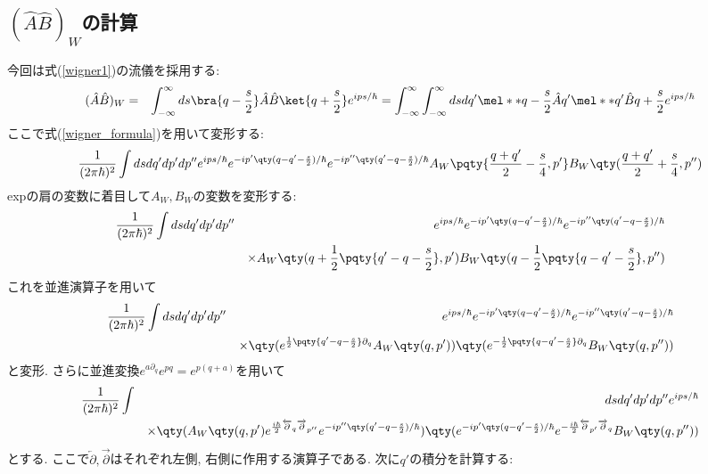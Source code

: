 \documentclass[10.5pt,a4paper]{jreport}
\begin{document}
\subsection{$(\hat{A}\hat{B})_W$の計算}
今回は式(\ref{wigner1})の流儀を採用する:
\begin{eqnarray}
  (\hat{A}\hat{B})_W &=& \int_{-\infty}^{\infty}ds \bra{q-\frac{s}{2}}\hat{A}\hat{B}\ket{q+\frac{s}{2}}e^{ips/\hbar}
  = \int_{-\infty}^{\infty}\int_{-\infty}^{\infty}ds dq' \mel**{q-\frac{s}{2}}{\hat{A}}{q'}\mel**{q'}{\hat{B}}{q+\frac{s}{2}}e^{ips/\hbar}\label{wigner_start}
\end{eqnarray}
ここで式(\ref{wigner_formula})を用いて変形する:
\begin{eqnarray}
  \frac{1}{(2\pi\hbar)^2}\int ds dq' dp' dp'' e^{ips/\hbar}e^{-ip'\qty(q-q'-\frac{s}{2})/\hbar} e^{-ip''\qty(q'-q-\frac{s}{2})/\hbar}A_W\pqty{\frac{q+q'}{2} - \frac{s}{4}, p'}B_W\qty(\frac{q+q'}{2} + \frac{s}{4}, p'')
\end{eqnarray}
expの肩の変数に着目して$A_W, B_W$の変数を変形する:
\begin{eqnarray}
  \nonumber\frac{1}{(2\pi\hbar)^2}\int ds dq' dp' dp'' &&e^{ips/\hbar}e^{-ip'\qty(q-q'-\frac{s}{2})/\hbar} e^{-ip''\qty(q'-q-\frac{s}{2})/\hbar}\\
  && \times A_W\qty(q + \frac{1}{2}\pqty{q'-q-\frac{s}{2}}, p')B_W\qty(q - \frac{1}{2}\pqty{q-q'-\frac{s}{2}}, p'')
\end{eqnarray}
これを並進演算子を用いて
\begin{eqnarray}
  \nonumber\frac{1}{(2\pi\hbar)^2}\int ds dq' dp' dp'' &&e^{ips/\hbar}e^{-ip'\qty(q-q'-\frac{s}{2})/\hbar}e^{-ip''\qty(q'-q-\frac{s}{2})/\hbar}\\
  &&\times\qty(e^{\frac{1}{2}\pqty{q'-q-\frac{s}{2}}\partial_q}A_W\qty(q, p'))\qty(e^{-\frac{1}{2}\pqty{q-q'-\frac{s}{2}}\partial_q}B_W\qty(q, p''))
\end{eqnarray}
と変形. さらに並進変換$e^{a\partial_q}e^{pq} = e^{p(q+a)}$を用いて
\begin{eqnarray}
  \nonumber\frac{1}{(2\pi\hbar)^2}\int&& ds dq' dp' dp'' e^{ips/\hbar}\\
  &&\times\qty(A_W\qty(q, p')e^{\frac{i\hbar}{2}\overleftarrow{\partial}_q\overrightarrow{\partial}_{p''}}e^{-ip''\qty(q'-q-\frac{s}{2})/\hbar})\qty(e^{-ip'\qty(q-q'-\frac{s}{2})/\hbar}e^{-\frac{i\hbar}{2}\overleftarrow{\partial}_{p'}\overrightarrow{\partial}_{q}}B_W\qty(q, p''))
\end{eqnarray}
とする. ここで$\overleftarrow{\partial}, \overrightarrow{\partial}$はそれぞれ左側, 右側に作用する演算子である. 次に$q'$の積分を計算する:
\end{document}
